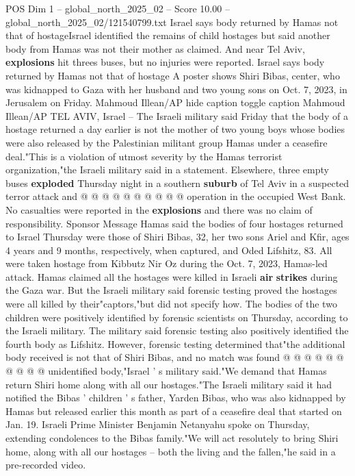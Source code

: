 \begin{textsample}{POS Dim 1 – global\_north\_2025\_02 – Score 10.00 – global\_north\_2025\_02/121540799.txt}  \label{ex:f1_pos_445}
Israel says body returned by Hamas not that of hostageIsrael identified the remains of child hostages but said another body from Hamas was not their mother as claimed.
And near Tel Aviv, \textbf{explosions} hit threes buses, but no injuries were reported.
Israel says body returned by Hamas not that of hostage A poster shows Shiri Bibas, center, who was kidnapped to Gaza with her husband and two young sons on Oct. 7, 2023, in Jerusalem on Friday.
Mahmoud Illean/AP hide caption toggle caption Mahmoud Illean/AP TEL AVIV, Israel -- The Israeli military said Friday that the body of a hostage returned a day earlier is not the mother of two young boys whose bodies were also released by the Palestinian militant group Hamas under a ceasefire deal."This is a violation of utmost severity by the Hamas terrorist organization,"the Israeli military said in a statement.
Elsewhere, three empty buses \textbf{exploded} Thursday night in a southern \textbf{suburb} of Tel Aviv in a suspected terror attack and @ @ @ @ @ @ @ @ @ @ operation in the occupied West Bank.
No casualties were reported in the \textbf{explosions} and there was no claim of responsibility.
Sponsor Message Hamas said the bodies of four hostages returned to Israel Thursday were those of Shiri Bibas, 32, her two sons Ariel and Kfir, ages 4 years and 9 months, respectively, when captured, and Oded Lifshitz, 83.
All were taken hostage from Kibbutz Nir Oz during the Oct. 7, 2023, Hamas-led attack.
Hamas claimed all the hostages were killed in Israeli \textbf{air} \textbf{strikes} during the Gaza war.
But the Israeli military said forensic testing proved the hostages were all killed by their"captors,"but did not specify how.
The bodies of the two children were positively identified by forensic scientists on Thursday, according to the Israeli military.
The military said forensic testing also positively identified the fourth body as Lifshitz.
However, forensic testing determined that"the additional body received is not that of Shiri Bibas, and no match was found @ @ @ @ @ @ @ @ @ @ unidentified body,"Israel ' s military said."We demand that Hamas return Shiri home along with all our hostages."The Israeli military said it had notified the Bibas ' children ' s father, Yarden Bibas, who was also kidnapped by Hamas but released earlier this month as part of a ceasefire deal that started on Jan. 19.
Israeli Prime Minister Benjamin Netanyahu spoke on Thursday, extending condolences to the Bibas family."We will act resolutely to bring Shiri home, along with all our hostages -- both the living and the fallen,"he said in a pre-recorded video.

\end{textsample}
